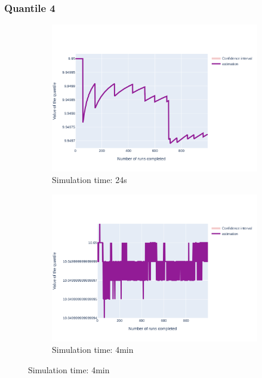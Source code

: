\documentclass{article}
\begin{document}
\subsubsection{Quantile 4}
\begin{figure}[H]
    \centering
    \begin{subfigure}{.495\textwidth}
        \centering
        \includegraphics[width=\textwidth]{../fig/quantile4/VD2_24s.png}
        \caption{Simulation time: 24s}
        \vspace{.5cm}
    \end{subfigure}
    \begin{subfigure}{.495\textwidth}
        \centering
        \includegraphics[width=\textwidth]{../fig/quantile4/VD2_4mn.png}
        \caption{Simulation time: 4min}
        \vspace{.5cm}

\end{subfigure}
\end{figure}
\end{document}
